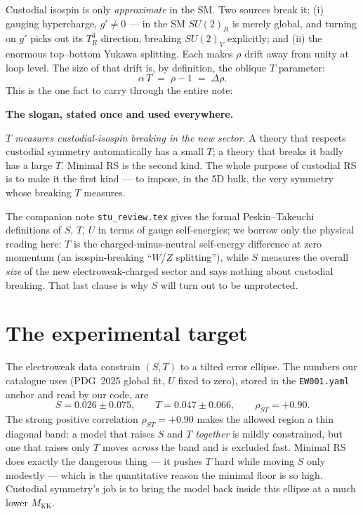\documentclass[11pt]{article}
\newenvironment{callout}[1]{%
  \par\medskip\begin{shaded}\noindent\textbf{#1}\par\smallskip}{\end{shaded}\medskip}
\newcommand{\MKK}{M_{\mathrm{KK}}}
\newcommand{\SUR}{SU(2)_R}
\newcommand{\code}[1]{\texttt{#1}}
\newcommand{\rhoparam}{\rho}
\theoremstyle{definition}
\begin{document}
Custodial isospin is only \emph{approximate} in the SM. Two sources break it: (i)
gauging hypercharge, $g'\neq 0$ --- in the SM $\SUR$ is merely global, and turning
on $g'$ picks out its $T^3_R$ direction, breaking $SU(2)_V$ explicitly; and (ii)
the enormous top--bottom Yukawa splitting. Each makes $\rhoparam$ drift away from
unity at loop level. The size of that drift is, by definition, the oblique $T$
parameter:
\begin{equation}
\alpha\,T \;=\; \rhoparam - 1 \;=\; \Delta\rhoparam .
\label{eq:Tisrho}
\end{equation}
This is the one fact to carry through the entire note:

\begin{callout}{The slogan, stated once and used everywhere.}
\emph{$T$ measures custodial-isospin breaking in the new sector.} A theory that
respects custodial symmetry automatically has a small $T$; a theory that breaks
it badly has a large $T$. Minimal RS is the second kind. The whole purpose of
custodial RS is to make it the first kind --- to impose, in the 5D bulk, the very
symmetry whose breaking $T$ measures.
\end{callout}

\noindent The companion note \code{stu\_review.tex} gives the formal
Peskin--Takeuchi definitions of $S$, $T$, $U$ in terms of gauge self-energies; we
borrow only the physical reading here: $T$ is the charged-minus-neutral
self-energy difference at zero momentum (an isospin-breaking ``$W$/$Z$
splitting''), while $S$ measures the overall \emph{size} of the new
electroweak-charged sector and says nothing about custodial breaking. That last
clause is why $S$ will turn out to be unprotected.

\section{The experimental target}
\label{sec:target}

The electroweak data constrain $(S,T)$ to a tilted error ellipse. The numbers our
catalogue uses (PDG~2025 global fit, $U$ fixed to zero), stored in the
\code{EW001.yaml} anchor and read by our code, are
\begin{equation}
S = 0.026 \pm 0.075, \qquad T = 0.047 \pm 0.066, \qquad \rho_{ST} = +0.90 .
\label{eq:fit}
\end{equation}
The strong positive correlation $\rho_{ST}=+0.90$ makes the allowed region a thin
diagonal band: a model that raises $S$ and $T$ \emph{together} is mildly
constrained, but one that raises only $T$ moves \emph{across} the band and is
excluded fast. Minimal RS does exactly the dangerous thing --- it pushes $T$ hard
while moving $S$ only modestly --- which is the quantitative reason the minimal
floor is so high. Custodial symmetry's job is to bring the model back inside this
ellipse at a much lower $\MKK$.
\end{document}
